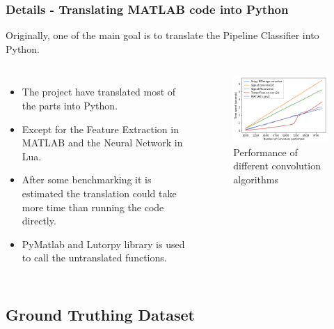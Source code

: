 \documentclass{beamer}[fullspacing]
\begin{document}
\begin{frame}
\frametitle{Details - Translating MATLAB code into Python}

Originally, one of the main goal is to translate the Pipeline Classifier into Python.

\begin{columns}
\begin{itemize}
\item
The project have translated most of the parts into Python.
\item
Except for the Feature Extraction in MATLAB and the Neural Network in Lua.
\item
After some benchmarking it is estimated the translation could take more time than running the code directly.
\item 
PyMatlab and Lutorpy library is used to call the untranslated functions.
\end{itemize}

\begin{figure}
\includegraphics[scale=0.3]{image/benchmark.png}
\caption{Performance of different convolution algorithms}
\end{figure}
\end{columns}

\end{frame}



\subsection{Ground Truthing Dataset}
\end{document}
